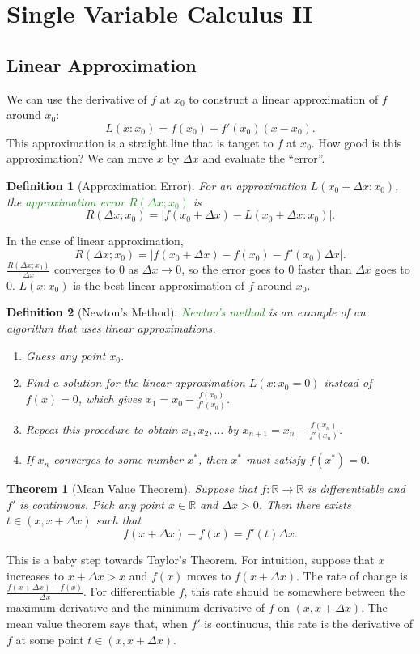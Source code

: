 \documentclass[11pt]{article}
\newtheorem*{definition}{Definition}
\newtheorem*{theorem}{Theorem}
\newcommand{\gr}{\textcolor{ForestGreen}}
\begin{document}
\section{Single Variable Calculus II}
\label{sec:org4102693}
\subsection{Linear Approximation}
\label{sec:org59fdb9a}
We can use the derivative of \(f\) at \(x_0\) to construct a linear approximation of \(f\) around \(x_0\):
\[
L(x:x_0) = f(x_0) + f'(x_0)(x - x_0).
\]
This approximation is a straight line that is tanget to \(f\) at \(x_0\). How good is this approximation? We can move \(x\) by \(\Delta x\) and evaluate the ``error''.

\begin{definition}[Approximation Error]
For an approximation $L(x_0 + \Delta x: x_0)$, the \gr{approximation error $R(\Delta x; x_0)$} is 
\[
R(\Delta x; x_0) = |f(x_0 + \Delta x) - L(x_0 + \Delta x: x_0)|.
\]
\end{definition}
In the case of linear approximation,
\[
R(\Delta x; x_0) = |f(x_0 + \Delta x) - f(x_0) - f'(x_0)\Delta x|.
\]
\(\frac{R(\Delta x; x_0)}{\Delta x}\) converges to \(0\) as \(\Delta x \to 0\), so the error goes to \(0\) faster than \(\Delta x\) goes to \(0\). \(L(x: x_0)\) is the best linear approximation of \(f\) around \(x_0\).
\begin{definition}[Newton's Method]
\gr{Newton's method} is an example of an algorithm that uses linear approximations.
\begin{enumerate}
\item Guess any point $x_0$.
\item Find a solution for the linear approximation $L(x: x_0 = 0)$ instead of $f(x) = 0$, which gives $x_1 = x_0 - \frac{f(x_0)}{f'(x_0)}$.
\item Repeat this procedure to obtain $x_1, x_2, \ldots$ by $x_{n + 1} = x_n - \frac{f(x_n)}{f'(x_n)}$.
\item If $x_n$ converges to some number $x^*$, then $x^*$ must satisfy $f(x^*) = 0$.
\end{enumerate}
\end{definition}

\begin{theorem}[Mean Value Theorem]
Suppose that $f: \mathbb{R} \to \mathbb{R}$ is differentiable and $f'$ is continuous. Pick any point $x \in \mathbb{R}$ and $\Delta x > 0$. Then there exists $t \in (x, x + \Delta x)$ such that
\[
f(x + \Delta x) - f(x) = f'(t)\Delta x.
\]
\end{theorem}
This is a baby step towards Taylor's Theorem. For intuition, suppose that \(x\) increases to \(x + \Delta x > x\) and \(f(x)\) moves to \(f(x + \Delta x)\). The rate of change is \(\frac{f(x + \Delta x) - f(x)}{\Delta x}\). For differentiable \(f\), this rate should be somewhere between the maximum derivative and the minimum derivative of \(f\) on \((x, x + \Delta x)\). The mean value theorem says that, when \(f'\) is continuous, this rate is the derivative of \(f\) at some point \(t \in (x, x + \Delta x)\).
\end{document}
